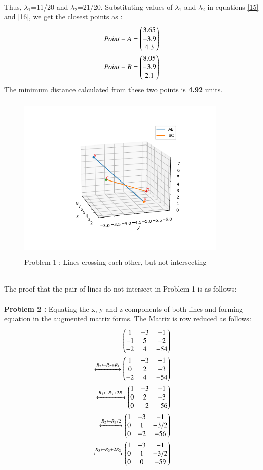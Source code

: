 \documentclass[journal,12pt,twocolumn]{IEEEtran}
\begin{document}
\\
Thus, $\lambda_1$=11/20 and $\lambda_2$=21/20. Substituting values of $\lambda_1$ and $\lambda_2$ in equations \ref{15} and \ref{16}, we get the closest points as :\\
\begin{align}
 Point-A = \begin{pmatrix}3.65 \\ -3.9\\ 4.3\end{pmatrix}\\ 
   Point-B= \begin{pmatrix}8.05\\ -3.9\\ 2.1\end{pmatrix} 
\end{align} 
The minimum distance calculated from these two points is \textbf{4.92} units.

\newpage
\begin{figure}[h!]
\centering
\includegraphics[width=10cm, height=8cm]{Figure_1}
\caption{Problem 1 : Lines crossing each other, but not intersecting}
\label{Fig2}
\end{figure}
\\
The proof that the pair of lines do not intersect in Problem 1 is as follows:\\
\\
\textbf{Problem 2 :} Equating the x, y and z components of both lines and forming equation in the augmented matrix forms. The Matrix is row reduced as follows:\\
\begin{align}
\begin{pmatrix}1 & -3 & -1\\-1 & 5 & -2\\-2 &4&-54\end{pmatrix}\\
\xleftrightarrow[]{R_2\leftarrow R_2+R_1}
\begin{pmatrix}1 & -3 & -1 \\0 & 2 & -3\\-2 &4&-54\end{pmatrix}\\
\xleftrightarrow[]{R_3\leftarrow R_3+2R_1}   
\begin{pmatrix}1 & -3 & -1 \\0 & 2 & -3\\0 &-2&-56\end{pmatrix}\\
\xleftrightarrow[]{R_2\leftarrow R_2/2}
\begin{pmatrix}1 & -3 & -1 \\0 & 1 & -3/2\\0 &-2&-56\end{pmatrix}\\
\xleftrightarrow[]{R_3\leftarrow R_3+2R_2}
\begin{pmatrix}1 & -3 & -1 \\0 & 1 & -3/2\\0 &0&-59\end{pmatrix}
\end{align} 
\end{document}
